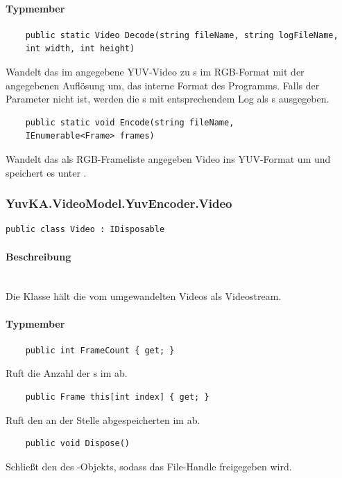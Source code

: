 \paragraph{Typmember}
\begin{itemize}

	\begin{verbatim}
	public static Video Decode(string fileName, string logFileName,
    int width, int height)
	\end{verbatim}
	Wandelt das im  angegebene YUV-Video zu s im RGB-Format mit der angegebenen Auflösung um, das interne Format des Programms. Falls der Parameter  nicht  ist, werden die s mit entsprechendem Log als s ausgegeben.

	\begin{verbatim}
	public static void Encode(string fileName,
    IEnumerable<Frame> frames)
	\end{verbatim}
	Wandelt das als RGB-Frameliste angegeben Video ins YUV-Format um und speichert es unter . 

\end{itemize}

\subsubsection*{YuvKA.VideoModel.YuvEncoder.Video}

\begin{verbatim}
public class Video : IDisposable
\end{verbatim}

\paragraph{Beschreibung}~\\
Die Klasse  hält die vom  umgewandelten Videos als Videostream.

\paragraph{Typmember}
\begin{itemize}

	\begin{verbatim}
	public int FrameCount { get; }
	\end{verbatim}
	Ruft die Anzahl der s im  ab.

	\begin{verbatim}
	public Frame this[int index] { get; }
	\end{verbatim}
	Ruft den an der Stelle  abgespeicherten  im  ab.

	\begin{verbatim}
	public void Dispose()
	\end{verbatim}
	Schließt den  des -Objekts, sodass das File-Handle freigegeben wird.

\end{itemize}

